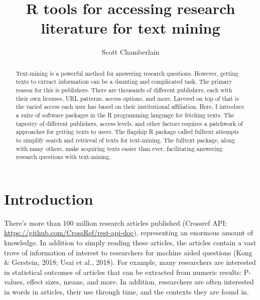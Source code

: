 \documentclass[author-year, review, 11pt]{components/elsarticle} %
\begin{document}
\begin{frontmatter}

  \title{R tools for accessing research literature for text mining}
    \author[cstar]{Scott Chamberlain}
      \address[cstar]{rOpenSci, Museum of Paleontology, University of California, Berkeley,
CA, USA}
  
  \begin{abstract}
  Text-mining is a powerful method for answering research questions.
  However, getting texts to extract information can be a daunting and
  complicated task. The primary reason for this is publishers. There are
  thousands of different publishers, each with their own licenses, URL
  patterns, access options, and more. Layered on top of that is the varied
  access each user has based on their institutional affiliation. Here, I
  introduce a suite of software packages in the R programming language for
  fetching texts. The tapestry of different publishers, access levels, and
  other factors requires a patchwork of approaches for getting texts to
  users. The flagship R package called fulltext attempts to simplify
  search and retrieval of texts for text-mining. The fulltext package,
  along with many others, make acquiring texts easier than ever,
  facilitating answering research questions with text-mining.
  \end{abstract}
  
 \end{frontmatter}


\newpage

\hypertarget{introduction}{%
\section{Introduction}\label{introduction}}

There's more than 100 million research articles published (Crossref API:
\url{https://github.com/CrossRef/rest-api-doc}), representing an
enormous amount of knowledge. In addition to simply reading these
articles, the articles contain a vast trove of information of interest
to researchers for machine aided questions (Kong \& Gerstein, 2018; Usai
et al., 2018). For example, many researchers are interested in
statistical outcomes of articles that can be extracted from numeric
results: P-values, effect sizes, means, and more. In addition,
researchers are often interested in words in articles, their use through
time, and the contexts they are found in.
\end{document}
